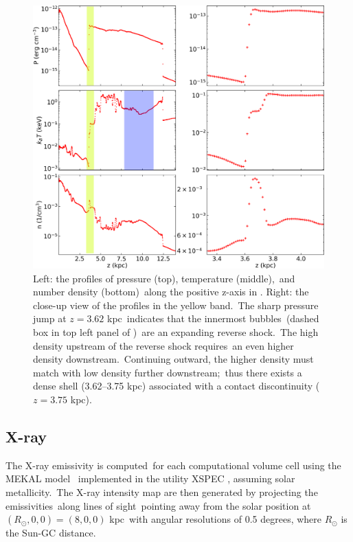 \documentclass[twocolumn]{aastex631}
\begin{document}
  \begin{figure}
    \includegraphics[width=\columnwidth]{figures/fig__profile.png}
    \caption{
             Left: the profiles of pressure (top), temperature (middle),\
             and number density (bottom)\
             along the positive z-axis in .
             Right: the close-up view of the profiles in the yellow band.\
             The sharp pressure jump at $z=3.62$ kpc\
             indicates that the innermost bubbles\
             (dashed box in top left panel of )\
             are an expanding reverse shock.\
             The high density upstream of the reverse shock requires\
             an even higher density downstream.\
             Continuing outward, the higher density must match with low density further downstream;\
             thus there exists a dense shell (3.62--3.75 kpc) associated with a contact discontinuity ($z=3.75$ kpc).
     }
    \label{fig__profile}
  \end{figure}

  \subsection{X-ray}
  \label{X-ray}
  The X-ray emissivity is computed\
  for each computational volume cell
  using the MEKAL model \citep{Xray-1,Xray-2,Xray-3}\
  implemented in the utility XSPEC \citep{XSPEC}, assuming solar metallicity.\
  The X-ray intensity map are then generated by projecting the emissivities\
  along lines of sight\
  pointing away from the solar position at $(R_{\odot},0,0)=(8,0,0)$ kpc\
  with angular resolutions of 0.5 degrees, where $R_{\odot}$ is the Sun-GC distance.
\end{document}
